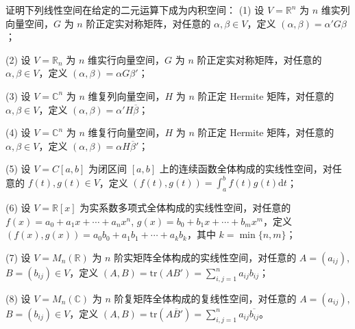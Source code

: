 \documentclass[../../main.tex]{subfiles}
\begin{document}
\begin{example}[常见内积和内积空间]\label{example:常见内积和内积空间-例9.1}
    
证明下列线性空间在给定的二元运算下成为内积空间：
(1) 设 $V = \mathbb{R}^n$ 为 $n$ 维实列向量空间，$G$ 为 $n$ 阶正定实对称矩阵，对任意的 $\alpha, \beta \in V$，定义 $(\alpha, \beta) = \alpha'G\beta$；

(2) 设 $V = \mathbb{R}_n$ 为 $n$ 维实行向量空间，$G$ 为 $n$ 阶正定实对称矩阵，对任意的 $\alpha, \beta \in V$，定义 $(\alpha, \beta) = \alpha G\beta'$；

(3) 设 $V = \mathbb{C}^n$ 为 $n$ 维复列向量空间，$H$ 为 $n$ 阶正定 Hermite 矩阵，对任意的 $\alpha, \beta \in V$，定义 $(\alpha, \beta) = \alpha' H\overline{\beta}$；

(4) 设 $V = \mathbb{C}^n$ 为 $n$ 维复行向量空间，$H$ 为 $n$ 阶正定 Hermite 矩阵，对任意的 $\alpha, \beta \in V$，定义 $(\alpha, \beta) = \alpha H\overline{\beta}'$；

(5) 设 $V = C[a, b]$ 为闭区间 $[a, b]$ 上的连续函数全体构成的实线性空间，对任意的 $f(t), g(t) \in V$，定义 $(f(t), g(t)) = \int_{a}^{b} f(t)g(t) \mathrm{d}t$；

(6) 设 $V = \mathbb{R}[x]$ 为实系数多项式全体构成的实线性空间，对任意的 $f(x) = a_0 + a_1x + \cdots + a_nx^n$, $g(x) = b_0 + b_1x + \cdots + b_mx^m$，定义 $(f(x), g(x)) = a_0b_0 + a_1b_1 + \cdots + a_kb_k$，其中 $k = \min\{n, m\}$；

(7) 设 $V = M_n(\mathbb{R})$ 为 $n$ 阶实矩阵全体构成的实线性空间，对任意的 $A = (a_{ij})$, $B = (b_{ij}) \in V$，定义 $(A, B) = \mathrm{tr}(AB') = \sum_{i, j = 1}^{n} a_{ij}b_{ij}$；

(8) 设 $V = M_n(\mathbb{C})$ 为 $n$ 阶复矩阵全体构成的复线性空间，对任意的 $A = (a_{ij})$, $B = (b_{ij}) \in V$，定义 $(A, B) = \mathrm{tr}(A\overline{B}') = \sum_{i, j = 1}^{n} a_{ij}\overline{b_{ij}}$。
\end{example}
\end{document}
